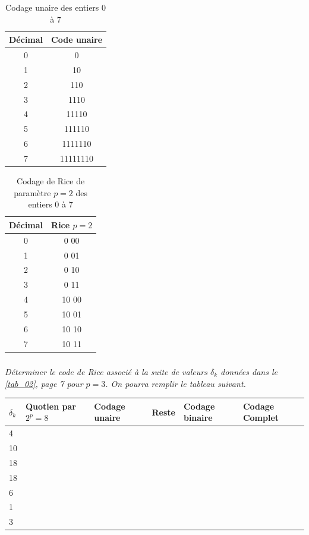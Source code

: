 \documentclass[10pt,fleqn]{article} %
\begin{document}
\begin{minipage}[b]{.45\linewidth}
\begin{table}[H]
\centering
\begin{tabular}{|c|c|}
\hline
Décimal & Code unaire \\
\hline
0& 0 \\
1& 10 \\
2& 110 \\
3& 1110 \\
4& 11110 \\
5& 111110 \\
6& 1111110 \\
7& 11111110 \\ \hline
\end{tabular}
\caption{Codage unaire des entiers 0 à 7 \label{tab_03}}
\end{table}
\end{minipage}
\hfill
\begin{minipage}[b]{.45\linewidth}
\begin{table}[H]
\centering
\begin{tabular}{|c|c|}
\hline
Décimal & Rice $p=2$\\
\hline
0 & 0 00 \\
1 & 0 01 \\
2 & 0 10 \\
3 & 0 11 \\
4 & 10 00 \\
5 & 10 01 \\
6 & 10 10 \\
7 & 10 11 \\
\hline
\end{tabular}
\caption{Codage de Rice de paramètre $p = 2$ des entiers 0 à 7 \label{tab_04}}
\end{table}
\end{minipage}

\vspace{.25cm}
\fi

\subparagraph{}\textit{Déterminer le code de Rice associé à la suite de valeurs $\delta_k$ données dans le \autoref{tab_02},
page 7 pour $p = 3$. On pourra remplir le tableau suivant.}


\ifprof
\else

\begin{center}
\begin{tabular}{|p{}|p{}|p{}|p{}|p{}|p{}|}
\hline
$\delta_k$& Quotien par $2^p=8$ & Codage unaire & Reste & Codage binaire & Codage Complet \\
\hline 
4 &  &  &  &  &  \\ 
\hline 
10 &  &  &  &  &  \\ 
\hline 
18 &  &  &  &  &  \\ 
\hline 
18 &  &  &  &  &  \\ 
\hline 
6 &  &  &  &  &  \\ 
\hline 
1 &  &  &  &  &  \\ 
\hline 
3 &  &  &  &  &  \\ 
\hline 
\end{tabular}
\end{center}
\end{document}
